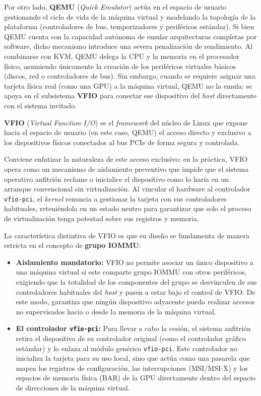 Por otro lado, \textbf{QEMU} (\textit{Quick Emulator}) actúa en el espacio de usuario gestionando el ciclo de vida de la máquina virtual y modelando la 
topología de la plataforma (controladores de bus, temporizadores y periféricos estándar). Si bien QEMU cuenta con la capacidad autónoma de emular arquitecturas 
completas por software, dicho mecanismo introduce una severa penalización de rendimiento. Al combinarse con KVM, QEMU delega la CPU y la memoria en el 
procesador físico, asumiendo únicamente la creación de los periféricos virtuales básicos (discos, red o controladores de bus). Sin embargo, cuando se 
requiere asignar una tarjeta física real (como una GPU) a la máquina virtual, QEMU no la emula: se apoya en el subsistema \textbf{VFIO} para conectar ese 
dispositivo del \textit{host} directamente con el sistema invitado.

\textbf{VFIO} (\textit{Virtual Function I/O}) es el \textit{framework} del núcleo de Linux que expone hacia el espacio de usuario (en este caso, QEMU) el 
acceso directo y exclusivo a los dispositivos físicos conectados al bus PCIe de forma segura y controlada.

Conviene enfatizar la naturaleza de este acceso exclusivo: en la práctica, VFIO opera como un mecanismo de aislamiento preventivo que impide que el sistema 
operativo anfitrión reclame o inicialice el dispositivo como lo haría en un arranque convencional sin virtualización. Al vincular el hardware al controlador 
\texttt{vfio-pci}, el \textit{kernel} renuncia a gestionar la tarjeta con sus controladores habituales, reteniéndola en un estado neutro para garantizar que 
solo el proceso de virtualización tenga potestad sobre sus registros y memoria.

La característica distintiva de VFIO es que su diseño se fundamenta de manera estricta en el concepto de \textbf{grupo IOMMU}:

\begin{itemize}
    \item \textbf{Aislamiento mandatorio:} VFIO no permite asociar un único dispositivo a una máquina virtual si este comparte grupo IOMMU con otros 
    periféricos, exigiendo que la totalidad de los componentes del grupo se desvinculen de sus controladores habituales del \textit{host} y pasen a estar 
    bajo el control de VFIO. De este modo, garantiza que ningún dispositivo adyacente pueda realizar accesos no supervisados hacia o desde la memoria de la
    máquina virtual.
    \item \textbf{El controlador \texttt{vfio-pci}:} Para llevar a cabo la cesión, el sistema anfitrión retira el dispositivo de su controlador original 
    (como el controlador gráfico estándar) y lo enlaza al módulo genérico \texttt{vfio-pci}. Este controlador no inicializa la tarjeta para su uso local, 
    sino que actúa como una pasarela que mapea los registros de configuración, las interrupciones (MSI/MSI-X) y los espacios de memoria física (BAR) de la 
    GPU directamente dentro del espacio de direcciones de la máquina virtual.
\end{itemize}


